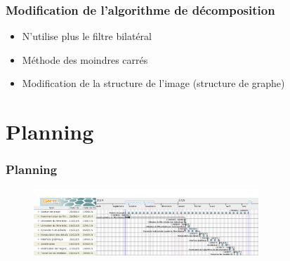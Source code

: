 \documentclass{polytech-presentation}
\begin{document}
		\begin{frame}
			\frametitle{Modification de l'algorithme de décomposition}
			\begin{itemize}
				\item N'utilise plus le filtre bilatéral
				\item Méthode des moindres carrés
				\item Modification de la structure de l'image (structure de graphe)
			\end{itemize}
		\end{frame}
		
\section{Planning}
	\begin{frame}
		\frametitle{Planning}
		\begin{figure}
		\includegraphics[width=320px]{../Gantt/Gantt.png} 
		\end{figure}
		
	\end{frame}				
\end{document}
